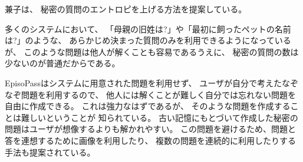 \documentclass[twoside]{wiss}
\begin{document}
兼子は、
秘密の質問のエントロピを上げる方法を提案している\cite{Kaneko}。

多くのシステムにおいて、
「母親の旧姓は?」や「最初に飼ったペットの名前は?」のような、
あらかじめ決まった質問のみを利用できるようになっているが、
このような問題は他人が解くことも容易であるうえに、
秘密の質問の数は少ないのが普通だからである\cite{Rabkin:2008:PKQ:1408664.1408667}。

EpisoPassはシステムに用意された問題を利用せず、
ユーザが自分で考えたなぞなぞ問題を利用するので、
他人には解くことが難しく自分では忘れない問題を自由に作成できる。
これは強力なはずであるが、
そのような問題を作成することは難しいということが
知られている\cite{Just:2009:PCC:1572532.1572543}\cite{Schechter:2009:NSM:1607723.1608145}。
%
%
%
古い記憶にもとづいて作成した秘密の問題はユーザが想像するよりも解かれやすい。
この問題を避けるため、問題と答を連想するために画像を利用したり、
複数の問題を連続的に利用したりする手法も提案されている\cite{Renaud:2010:PQE:2146303.2146318}。




\end{document}
